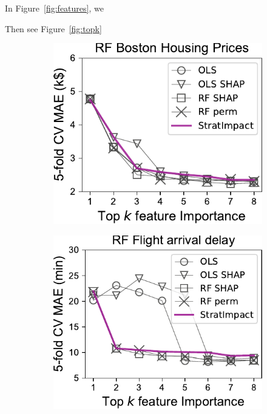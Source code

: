 \documentclass[11pt]{article}
\newcommand{\figref}[1]{Figure~\ref{#1}}
\begin{document}
In \figref{fig:features}, we

Then see \figref{fig:topk}

\begin{figure}
\centering
\begin{subfigure}{.245\textwidth}
    \centering
\includegraphics[scale=0.45]{images/boston-topk-RF-Importance.pdf}
\end{subfigure}%
\hfill
\begin{subfigure}{.245\textwidth}
    \centering
\includegraphics[scale=0.45]{images/flights-topk-RF-Importance.pdf}

\end{subfigure}
\end{figure}
\end{document}
